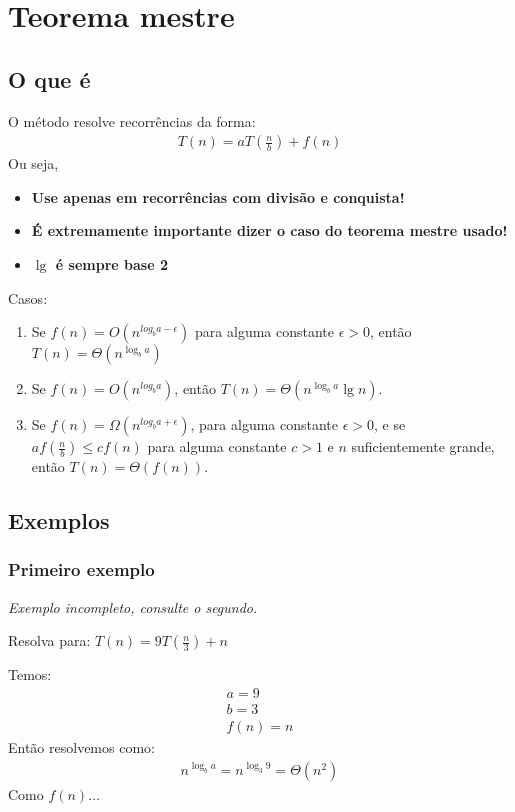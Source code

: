\documentclass{article}
\begin{document}
\section{Teorema mestre}
\subsection{O que é}
O método resolve recorrências da forma:
\begin{align*}
    T(n) = aT(\frac{n}{b}) + f(n)
\end{align*}
Ou seja,
\begin{itemize}
    \item \textbf{Use apenas em recorrências com divisão e conquista! }
    \item \textbf{É extremamente importante dizer o caso do teorema mestre usado!}
    \item \textbf{$\lg$ é sempre base 2}
\end{itemize}


Casos:
\begin{enumerate}
    \item Se $f(n) = O(n^{log_b a-\epsilon})$ para alguma constante $\epsilon > 0$, então $T(n) = \Theta(n^{\log_b a })$
    \item Se $f(n) = O(n^{log_b a})$, então $T(n) = \Theta(n^{\log_b a} \lg n)$.
    \item Se $f(n) = \Omega(n^{log_b a+\epsilon})$, para alguma constante $\epsilon > 0$, e se $af(\frac{n}{b}) \leq cf(n)$ para alguma constante $c > 1$ e $n$ suficientemente grande, então $T(n) = \Theta(f(n))$.
\end{enumerate}

\subsection{Exemplos}
\subsubsection{Primeiro exemplo}

\textit{Exemplo incompleto, consulte o segundo.}

Resolva para: $T(n) = 9T(\frac{n}{3}) + n $

Temos:
\begin{align*}
    a = 9\\
    b = 3 \\
    f(n) = n
\end{align*}
Então resolvemos como:
\begin{align*}
    n^{\log_b a} = n^{\log_3 9} = \Theta(n^2)
\end{align*}
Como $f(n) \dots$
\end{document}
